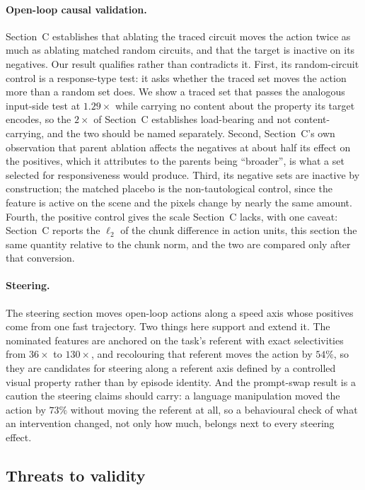\paragraph{Open-loop causal validation.}
Section~C establishes that ablating the traced circuit moves the action twice
as much as ablating matched random circuits, and that the target is inactive on
its negatives. Our result qualifies rather than contradicts it. First, its
random-circuit control is a response-type test: it asks whether the traced set
moves the action more than a random set does. We show a traced set that passes
the analogous input-side test at $1.29\times$ while carrying no content about
the property its target encodes, so the $2\times$ of Section~C establishes
load-bearing and not content-carrying, and the two should be named separately.
Second, Section~C's own observation that parent ablation affects the negatives
at about half its effect on the positives, which it attributes to the parents
being ``broader'', is what a set selected for responsiveness would produce.
Third, its negative sets are inactive by construction; the matched placebo is
the non-tautological control, since the feature is active on the scene and the
pixels change by nearly the same amount. Fourth, the positive control gives the
scale Section~C lacks, with one caveat: Section~C reports the $\ell_2$ of the
chunk difference in action units, this section the same quantity relative to
the chunk norm, and the two are compared only after that conversion.

\paragraph{Steering.}
The steering section moves open-loop actions along a speed axis whose positives
come from one fast trajectory. Two things here support and extend it. The
nominated features are anchored on the task's referent with exact
selectivities from $36\times$ to $130\times$, and recolouring that referent
moves the action by $54\%$, so they are candidates for steering along a
referent axis defined by a controlled visual property rather than by episode
identity. And the prompt-swap result is a caution the steering claims should
carry: a language manipulation moved the action by $73\%$ without moving the
referent at all, so a behavioural check of what an intervention changed, not
only how much, belongs next to every steering effect.

\subsection{Threats to validity}
\label{sec:threats}

